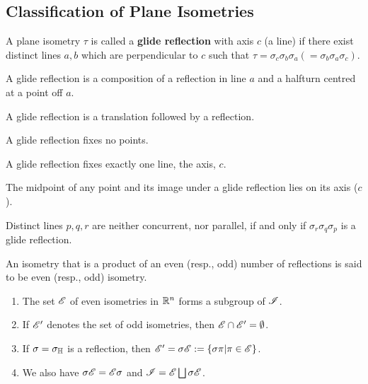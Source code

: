 \subsection{Classification of Plane Isometries}

\begin{definition}
    A plane isometry \(\tau\) is called a \textbf{glide reflection} with axis \(c\) (a line) if there exist distinct lines \(a, b\) which are perpendicular to \(c\) such that \(\tau = \sigma_c \sigma_b \sigma_a (= \sigma_b  \sigma_a \sigma_c)\).
\end{definition}

\begin{proposition}
    \begin{statements}{}
        \item A glide reflection is a composition of a reflection in line \(a\) and a halfturn centred at a point off \(a\).
        \item A glide reflection is a translation followed by a reflection.
        \item A glide reflection fixes no points.
        \item A glide reflection fixes exactly one line, the axis, \(c\).
        \item The midpoint of any point and its image under a glide reflection lies on its axis (\(c\)).
    \end{statements}
\end{proposition}

\begin{theorem}
    Distinct lines \(p, q, r\) are neither concurrent, nor parallel, if and only if \(\sigma_r \sigma_q \sigma_p\) is a glide reflection.
\end{theorem}

\begin{definition}
    An isometry that is a product of an even (resp., odd) number of reflections is said to be even (resp., odd) isometry.
\end{definition}

\begin{theorem}
    \begin{enumerate}
        \item The set \(\mathscr{E}\) of even isometries in \(\mathbb{R}^n\) forms a subgroup of \(\mathscr{I}\).
        \item If \(\mathscr{E}'\) denotes the set of odd isometries, then \(\mathscr{E} \cap \mathscr{E}' = \emptyset\).
        \item If \(\sigma = \sigma_{\mathbb{H}}\) is a reflection, then \(\mathscr{E}' = \sigma \mathscr{E} := \{ \sigma \pi | \pi \in \mathscr{E}\}\).
        \item We also have \(\sigma \mathscr{E} = \mathscr{E} \sigma\) and \(\mathscr{I} = \mathscr{E} \bigsqcup \sigma\mathscr{E}\).
    \end{enumerate}
\end{theorem}

